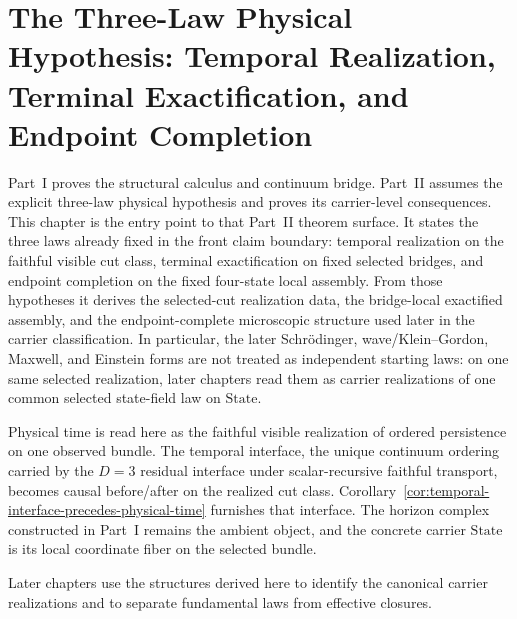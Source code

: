 \section{The Three-Law Physical Hypothesis: Temporal Realization, Terminal Exactification, and Endpoint Completion}
\label{sec:compiled-law-classes}

Part~I proves the structural calculus and continuum bridge. Part~II assumes
the explicit three-law physical hypothesis and proves its carrier-level
consequences. This chapter is the entry point to that Part~II theorem
surface. It states the three laws already fixed in the front claim boundary:
temporal realization on the faithful visible cut class, terminal
exactification on fixed selected bridges, and endpoint completion on the fixed
four-state local assembly. From those hypotheses it derives the selected-cut
realization data, the bridge-local exactified assembly, and the
endpoint-complete microscopic structure used later in the carrier
classification. In particular, the later Schr\"odinger,
wave/Klein--Gordon, Maxwell, and Einstein forms are not treated as
independent starting laws: on one same selected realization, later chapters
read them as carrier realizations of one common selected state-field law on
\(\mathrm{State}\).

Physical time is read here as the faithful visible realization of ordered
persistence on one observed bundle. The temporal interface, the unique
continuum ordering carried by the $D=3$ residual interface under
scalar-recursive faithful transport, becomes causal before/after on the
realized cut class. Corollary~\ref{cor:temporal-interface-precedes-physical-time}
furnishes that interface. The horizon complex constructed in Part~I remains
the ambient object, and the concrete carrier \(\mathrm{State}\) is its local
coordinate fiber on the selected bundle.

Later chapters use the structures derived here to identify the canonical
carrier realizations and to separate fundamental laws from effective closures.

